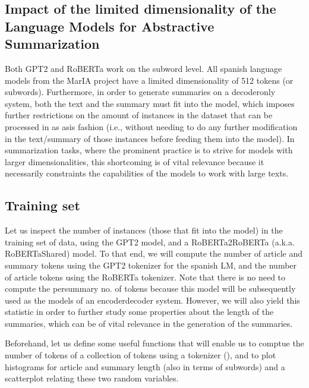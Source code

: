 \documentclass[letterpaper,10pt,english]{sphinxmanual}
\begin{document}
\subsection{Impact of the limited dimensionality of the Language Models for Abstractive Summarization}
\label{\detokenize{eda:Impact-of-the-limited-dimensionality-of-the-Language-Models-for-Abstractive-Summarization}}
\sphinxAtStartPar
Both GPT\sphinxhyphen{}2 and RoBERTa work on the subword level. All spanish language models from the MarIA project have a limited dimensionality of 512 tokens (or subwords). Furthermore, in order to generate summaries on a decoder\sphinxhyphen{}only system, both the text and the summary must fit into the model, which imposes further restrictions on the amount of instances in the dataset that can be processed in as as\sphinxhyphen{}is fashion (i.e., without needing to do any further modification in the text/summary of those instances
before feeding them into the model). In summarization tasks, where the prominent practice is to strive for models with larger dimensionalities, this shortcoming is of vital relevance because it necessarily constraints the capabilities of the models to work with large texts.


\subsection{Training set}
\label{\detokenize{eda:Training-set}}
\sphinxAtStartPar
Let us inspect the number of  instances (those that fit into the model) in the training set of data, using the GPT\sphinxhyphen{}2 model, and a RoBERTa2RoBERTa (a.k.a. RoBERTaShared) model. To that end, we will compute the number of article and summary tokens using the GPT\sphinxhyphen{}2 tokenizer for the spanish LM, and the number of article tokens using the RoBERTa tokenizer. Note that there is no need to compute the per\sphinxhyphen{}summary no. of tokens because this model will be subsequently used as the  models
of an encoder\sphinxhyphen{}decoder system. However, we will also yield this statistic in order to further study some properties about the length of the summaries, which can be of vital relevance in the generation of the summaries.

\sphinxAtStartPar
Beforehand, let us define some useful functions that will enable us to comptue the number of tokens of a collection of tokens using a tokenizer (), and to plot histograms for article and summary length (also in terms of subwords) and a scatterplot relating these two random variables.
\end{document}
